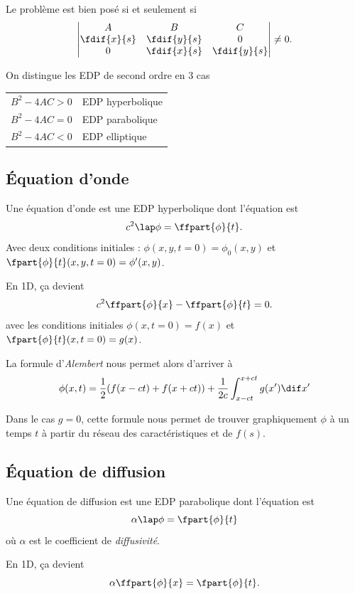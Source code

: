 Le problème est bien posé si et seulement si
\[
  \begin{vmatrix}
    A & B & C\\
    \fdif{x}{s} & \fdif{y}{s} & 0\\
    0 & \fdif{x}{s} & \fdif{y}{s}
  \end{vmatrix}
  \neq 0.
\]

On distingue les EDP de second ordre en 3 cas
\begin{center}
  \begin{tabular}{|l|l|}
    \hline
    $B^2 - 4AC > 0$ & EDP hyperbolique\\
    $B^2 - 4AC = 0$ & EDP parabolique\\
    $B^2 - 4AC < 0$ & EDP elliptique\\
    \hline
  \end{tabular}
\end{center}

\subsection{Équation d'onde}
Une équation d'onde est une EDP hyperbolique dont l'équation est
\[ c^2 \lap \phi = \ffpart{\phi}{t}. \]
Avec deux conditions initiales : $\phi(x, y, t=0) = \phi_0(x, y)$ et
$\fpart{\phi}{t}(x, y, t=0) = \phi'(x, y)$.

En 1D, ça devient
\[ c^2\ffpart{\phi}{x} - \ffpart{\phi}{t} = 0. \]
avec les conditions initiales $\phi(x, t=0) = f(x)$ et $\fpart{\phi}{t}(x, t=0) = g(x)$.

La formule d'\textit{Alembert} nous permet alors d'arriver à
\[ \phi(x, t) = \frac{1}{2}(f(x - ct) + f(x + ct)) + \frac{1}{2c}\int_{x-ct}^{x+ct}
g(x')\dif x'\]

Dans le cas $g=0$, cette formule nous permet de trouver graphiquement $\phi$ à un temps
$t$ à partir du réseau des caractéristiques et de $f(s)$.


\subsection{Équation de diffusion}
Une équation de diffusion est une EDP parabolique dont l'équation est
\[ \alpha \lap \phi = \fpart{\phi}{t} \]
où $\alpha$ est le coefficient de \emph{diffusivité}.

En 1D, ça devient
\[ \alpha \ffpart{\phi}{x} = \fpart{\phi}{t}. \]


